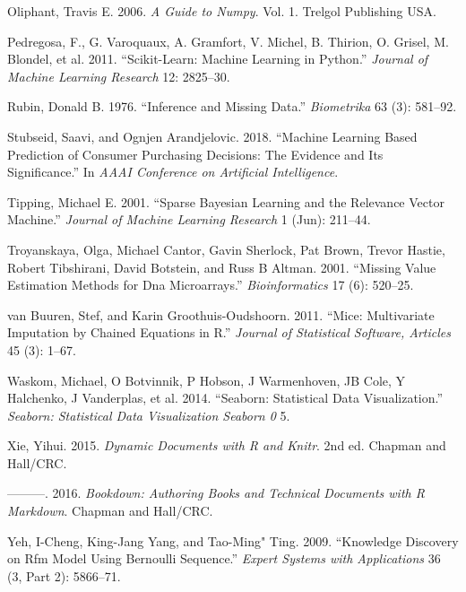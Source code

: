 \documentclass[
  11pt,
  a4paper,
  DIV=12,captions=tableheading,oneside,titlepage]{scrbook}
\begin{document}
\leavevmode\hypertarget{ref-oliphant2006guide}{}%
Oliphant, Travis E. 2006. \emph{A Guide to Numpy}. Vol. 1. Trelgol Publishing USA.

\leavevmode\hypertarget{ref-scikit-learn}{}%
Pedregosa, F., G. Varoquaux, A. Gramfort, V. Michel, B. Thirion, O. Grisel, M. Blondel, et al. 2011. ``Scikit-Learn: Machine Learning in Python.'' \emph{Journal of Machine Learning Research} 12: 2825--30.

\leavevmode\hypertarget{ref-rubin1976inference}{}%
Rubin, Donald B. 1976. ``Inference and Missing Data.'' \emph{Biometrika} 63 (3): 581--92.

\leavevmode\hypertarget{ref-stubseid2018}{}%
Stubseid, Saavi, and Ognjen Arandjelovic. 2018. ``Machine Learning Based Prediction of Consumer Purchasing Decisions: The Evidence and Its Significance.'' In \emph{AAAI Conference on Artificial Intelligence}.

\leavevmode\hypertarget{ref-tipping2001sparse}{}%
Tipping, Michael E. 2001. ``Sparse Bayesian Learning and the Relevance Vector Machine.'' \emph{Journal of Machine Learning Research} 1 (Jun): 211--44.

\leavevmode\hypertarget{ref-troyanskaya2001missing}{}%
Troyanskaya, Olga, Michael Cantor, Gavin Sherlock, Pat Brown, Trevor Hastie, Robert Tibshirani, David Botstein, and Russ B Altman. 2001. ``Missing Value Estimation Methods for Dna Microarrays.'' \emph{Bioinformatics} 17 (6): 520--25.

\leavevmode\hypertarget{ref-buuren2011mice}{}%
van Buuren, Stef, and Karin Groothuis-Oudshoorn. 2011. ``Mice: Multivariate Imputation by Chained Equations in R.'' \emph{Journal of Statistical Software, Articles} 45 (3): 1--67.

\leavevmode\hypertarget{ref-waskom2014seaborn}{}%
Waskom, Michael, O Botvinnik, P Hobson, J Warmenhoven, JB Cole, Y Halchenko, J Vanderplas, et al. 2014. ``Seaborn: Statistical Data Visualization.'' \emph{Seaborn: Statistical Data Visualization Seaborn 0} 5.

\leavevmode\hypertarget{ref-xie2015}{}%
Xie, Yihui. 2015. \emph{Dynamic Documents with R and Knitr}. 2nd ed. Chapman and Hall/CRC.

\leavevmode\hypertarget{ref-xie2016bookdown}{}%
---------. 2016. \emph{Bookdown: Authoring Books and Technical Documents with R Markdown}. Chapman and Hall/CRC.

\leavevmode\hypertarget{ref-yeh2009}{}%
Yeh, I-Cheng, King-Jang Yang, and Tao-Ming" Ting. 2009. ``Knowledge Discovery on Rfm Model Using Bernoulli Sequence.'' \emph{Expert Systems with Applications} 36 (3, Part 2): 5866--71.
\end{document}
